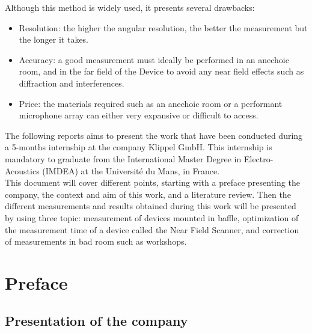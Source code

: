 \documentclass{report}
\begin{document}
Although this method is widely used, it presents several drawbacks:
\begin{itemize}
\item Resolution: the higher the angular resolution, the better the measurement but the longer it takes. 
\item Accuracy: a good measurement must ideally be performed in an anechoic room, and in the far field of the Device to avoid any near field effects such as diffraction and interferences.
\item Price: the materials required such as an anechoic room or a performant microphone array can either very expansive or difficult to access. 
\end{itemize}



The following reports aims to present the work that have been conducted during a 5-months internship at the company Klippel GmbH. This internship is mandatory to graduate from the International Master Degree in Electro-Acoustics (IMDEA) at the Université du Mans, in France. \\

This document will cover different points, starting with a preface presenting the company, the context and aim of this work, and a literature review. Then the different measurements and results obtained during this work will be presented by using three topic: measurement of devices mounted in baffle, optimization of the measurement time of a device called the Near Field Scanner, and correction of measurements in bad room such as workshops. 


\chapter{Preface}

    
\section{Presentation of the company}
\end{document}
